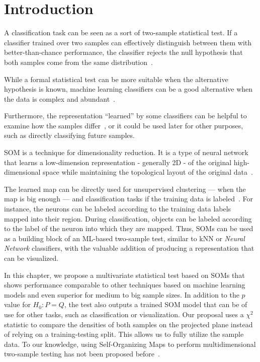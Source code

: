 
\section{Introduction}

A classification task can be seen as a sort of two-sample statistical test.
If a classifier trained over two samples can effectively distinguish between
them with better-than-chance performance, the classifier rejects the null
hypothesis that both samples come from the same distribution~\cite{friedman2004multivariate}.

While a formal statistical test can be more suitable when the alternative
hypothesis is known, machine learning classifiers can be a good alternative
when the data is complex and abundant~\cite{kirchler2020two,kim2021classification,pmlr-v119-liu20m}.

Furthermore, the representation ``learned'' by some classifiers can be helpful
to examine how the samples differ~\cite{friedman2004multivariate,lopez2016revisiting},
or it could be used later for other purposes, such as directly classifying future samples.

\medskip

\gls{SOM} is a technique for dimensionality
reduction. It is a type of neural network that learns a low-dimension representation
- generally 2D - of the original high-dimensional space while maintaining the topological
layout of the original data~\cite{kohonen1982self, Villmann1999}.

The learned map can be directly used for unsupervised clustering --- when the map is big enough ---
and classification tasks if the training data is labeled~\cite{ultsch2005esom,ultsch2007emergence}.
For instance, the neurons can be labeled according to the training data labels mapped into their
region. During classification, objects can be labeled according to the label of the neuron
into which they are mapped.
Thus, \glspl{SOM} can be used as a building block of an ML-based two-sample test, similar to
\gls{kNN} or \emph{Neural Network} classifiers, with the valuable addition
of producing a representation that can be visualized.

In this chapter, we propose a multivariate statistical test based on
\glspl{SOM} that shows performance comparable to other techniques based on 
machine learning models and even superior for medium to big sample sizes. In addition to the 
$p$ value for $H_0: P = Q$, the test also outputs a trained \gls{SOM} model that can be of
use for other tasks, such as classification or visualization.
Our proposal uses a $\chi^2$ statistic to compare the densities of both samples on
the projected plane instead of relying on a training-testing split. This allows us to fully
utilize the sample data. To our knowledge, using Self-Organizing Maps
to perform multidimensional two-sample testing has not been proposed
before~\cite{kaski1998bibliography,oja_bibliography_2003,polla_bibliography_2006}.

